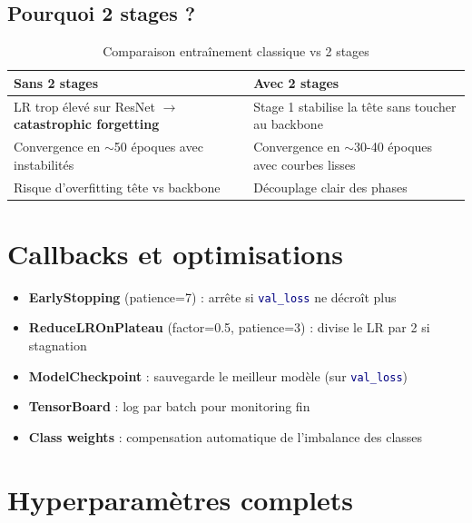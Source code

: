 \documentclass[11pt,a4paper,oneside]{report}
\newcommand{\code}[1]{\texttt{\textcolor{navy}{#1}}}
\begin{document}
\subsection{Pourquoi 2 stages ?}

\begin{table}[!htbp]
\centering
\caption{Comparaison entraînement classique vs 2 stages}
\begin{tabularx}{\textwidth}{|X|X|}
\hline
\rowcolor{accentred!15}
\textbf{Sans 2 stages} & \rowcolor{accentgreen!15}\textbf{Avec 2 stages} \\
\hline
LR trop élevé sur ResNet $\to$ \textbf{catastrophic forgetting} & Stage 1 stabilise la tête sans toucher au backbone \\
\hline
Convergence en $\sim$50 époques avec instabilités & Convergence en $\sim$30-40 époques avec courbes lisses \\
\hline
Risque d'overfitting tête vs backbone & Découplage clair des phases \\
\hline
\end{tabularx}
\end{table}

\section{Callbacks et optimisations}

\begin{itemize}
\item \textbf{EarlyStopping} (patience=7) : arrête si \code{val\_loss} ne décroît plus
\item \textbf{ReduceLROnPlateau} (factor=0.5, patience=3) : divise le LR par 2 si stagnation
\item \textbf{ModelCheckpoint} : sauvegarde le meilleur modèle (sur \code{val\_loss})
\item \textbf{TensorBoard} : log par batch pour monitoring fin
\item \textbf{Class weights} : compensation automatique de l'imbalance des classes
\end{itemize}

\section{Hyperparamètres complets}
\end{document}
